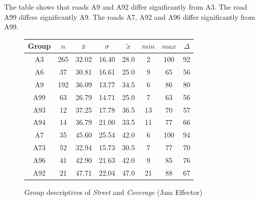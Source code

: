 The table shows that roads A9 and A92 differ significantly from A3. The road A99 differs significantly A9. The roads A7, A92 and A96 differ significantly from A99.
\begin{figure}[ht!]
	\centering
	\begin{minipage}{0.5\textwidth}
		\tiny
		\setlength{\tabcolsep}{4pt}
		\centering
		\begin{tabular}{c|c|c|c|c|c|c|c}
			\toprule
			Group & $n$ & $\bar{x}$ & $\sigma$ & $\tilde{x}$ & $min$ & $max$ & $\Delta$ \\
			\midrule
			A3   & 265 & 32.02 & 16.40 & 28.0 & 2  & 100 & 92 \\ 
			A6   & 37  & 30.81 & 16.61 & 25.0 & 9  & 65  & 56 \\ 
			A9   & 192 & 36.09 & 13.77 & 34.5 & 6  & 86  & 80 \\ 
			A99  & 63  & 26.79 & 14.71 & 25.0 & 7  & 63  & 56 \\ 
			A93  & 12  & 37.25 & 17.78 & 36.5 & 13 & 70  & 57 \\ 
			A94  & 14  & 36.79 & 21.00 & 33.5 & 11 & 77  & 66 \\ 
			A7   & 35  & 45.60 & 25.54 & 42.0 & 6  & 100 & 94 \\ 
			A73  & 52  & 32.94 & 15.73 & 30.5 & 7  & 77  & 70 \\ 
			A96  & 41  & 42.90 & 21.63 & 42.0 & 9  & 85  & 76 \\ 
			A92  & 21  & 47.71 & 22.04 & 47.0 & 21 & 88  & 67 \\ 
			\bottomrule
		\end{tabular}
		\label{tbl:descriptives_baysis_effector_Street_Cov}
	\end{minipage}%
	\begin{minipage}{0.55\textwidth}
		\data
		\pgfplotstablesort[sort key=mean, sort cmp=float >]{\datasorted}{\data}
		\tiny
		\centering
		\label{fig:descriptives_baysis_effector_Street_Cov}
	\end{minipage}%
	\caption{Group descriptives of \textit{Street} and \textit{Coverage} (Jam Effector)}
\end{figure}
